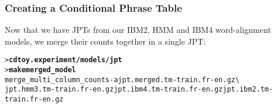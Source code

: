 \documentclass[11pt,letterpaper]{article}
\newcommand{\bs}{\textbackslash{}}
\begin{document}
\subsubsection{Creating a Conditional Phrase Table} \label{CPT}

Now that we have JPTs from our IBM2, HMM and IBM4
word-alignment models, we merge their counts together in a single JPT:
\begin{small}
\begin{alltt}
   > \textbf{cd toy.experiment/models/jpt}
   > \textbf{make merged_model}
   merge_multi_column_counts -a jpt.merged.tm-train.fr-en.gz \bs
      jpt.hmm3.tm-train.fr-en.gz jpt.ibm4.tm-train.fr-en.gz jpt.ibm2.tm-train.fr-en.gz
\end{alltt}
\end{small}
\end{document}
